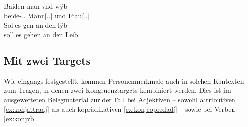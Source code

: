 \begin{exe}
\begin{xlist}
	\ex \label{ex:kczbeidenunde_2}
		\gll Baiden man vnd wÿb \\
			beide-\Dat.\Pl\subMF.\St{} Mann[\Dat.\Sg.\MascM] und
				Frau[\Dat.\Sg.\NeutF] \\
	\sn \gll Sol es gan an den lÿb \\
			soll es gehen an den Leib \\
		\begin{taggedline}{%
			\parencites[\pno~15ra,18--19]{kc:Z}[vgl.]%
			[\pno~4vb,2]{kc:C1}%
			[\pno~4vb,33--34]{kc:K}%
			[zu][846--849]{schroeder1895}}
		\trans {}
		\end{taggedline}
\end{xlist}
\end{exe}

\subsection{Mit zwei Targets}
\label{subsec:beidkoordtarg}

Wie eingangs festgestellt, kommen Personenmerkmale auch in solchen Kontexten
zum Tragen, in denen zwei Kongruenztargets kombiniert werden. Dies ist im
ausgewerteten Belegmaterial zur \KC{} der Fall bei Adjektiven --
sowohl attributiven \cref{ex:konjattradj} als auch koprädikativen
\cref{ex:konjcopredadj} -- sowie bei Verben \cref{ex:konjvb}.

